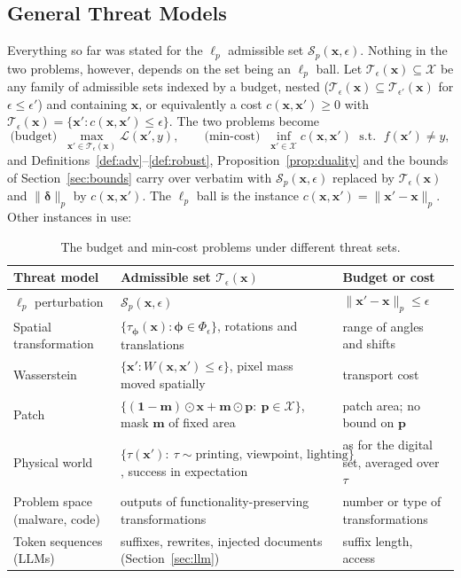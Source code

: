 \documentclass[10pt,a4paper]{extarticle}
\theoremstyle{definition}
\newcommand{\X}{\mathcal{X}}
\newcommand{\Loss}{\mathcal{L}}
\newcommand{\x}{\mathbf{x}}
\newcommand{\xadv}{\mathbf{x}'}
\newcommand{\bdelta}{\boldsymbol{\delta}}
\newcommand{\T}{\mathcal{T}}
\begin{document}
\subsection{General Threat Models}\label{sec:threatsets}

Everything so far was stated for the \(\ell_p\) admissible set \(\mathcal{S}_p(\x,\epsilon)\). Nothing in the two problems, however, depends on the set being an \(\ell_p\) ball. Let \(\T_\epsilon(\x)\subseteq\X\) be any family of admissible sets indexed by a budget, nested (\(\T_{\epsilon}(\x)\subseteq\T_{\epsilon'}(\x)\) for \(\epsilon\le\epsilon'\)) and containing \(\x\), or equivalently a cost \(c(\x,\xadv)\ge0\) with \(\T_\epsilon(\x)=\{\xadv: c(\x,\xadv)\le\epsilon\}\). The two problems become
\[
\text{(budget)}\;\;\max_{\xadv\in\T_\epsilon(\x)}\Loss(\xadv,y),
\qquad
\text{(min-cost)}\;\;\inf_{\xadv\in\X}c(\x,\xadv)\;\text{ s.t. }\;f(\xadv)\neq y,
\]
and Definitions~\ref{def:adv}--\ref{def:robust}, Proposition~\ref{prop:duality} and the bounds of Section~\ref{sec:bounds} carry over verbatim with \(\mathcal{S}_p(\x,\epsilon)\) replaced by \(\T_\epsilon(\x)\) and \(\|\bdelta\|_p\) by \(c(\x,\xadv)\). The \(\ell_p\) ball is the instance \(c(\x,\xadv)=\|\xadv-\x\|_p\). Other instances in use:

\begin{table}[h]
\centering
\small
\renewcommand{\arraystretch}{1.15}
\begin{tabularx}{\textwidth}{@{}l X X@{}}
\toprule
Threat model & Admissible set \(\T_\epsilon(\x)\) & Budget or cost \\
\midrule
\(\ell_p\) perturbation & \(\mathcal{S}_p(\x,\epsilon)\) & \(\|\xadv-\x\|_p\le\epsilon\) \\
Spatial transformation & \(\{\tau_{\boldsymbol{\phi}}(\x):\boldsymbol{\phi}\in\Phi_\epsilon\}\), rotations and translations \citep{engstrom2019exploring} & range of angles and shifts \\
Wasserstein & \(\{\xadv: W(\x,\xadv)\le\epsilon\}\), pixel mass moved spatially \citep{wong2019wasserstein} & transport cost \\
Patch & \(\{(\mathbf{1}-\mathbf{m})\odot\x+\mathbf{m}\odot\mathbf{p}:\ \mathbf{p}\in\X\}\), mask \(\mathbf{m}\) of fixed area \citep{brown2017adversarial} & patch area; no bound on \(\mathbf{p}\) \\
Physical world & \(\{\tau(\xadv):\ \tau\sim\text{printing, viewpoint, lighting}\}\), success in expectation \citep{athalye2018eot} & as for the digital set, averaged over \(\tau\) \\
Problem space (malware, code) & outputs of functionality-preserving transformations \citep{pierazzi2020intriguing} & number or type of transformations \\
Token sequences (LLMs) & suffixes, rewrites, injected documents (Section~\ref{sec:llm}) & suffix length, access \\
\bottomrule
\end{tabularx}
\caption{The budget and min-cost problems under different threat sets.}
\label{tab:threatsets}
\end{table}
\end{document}
